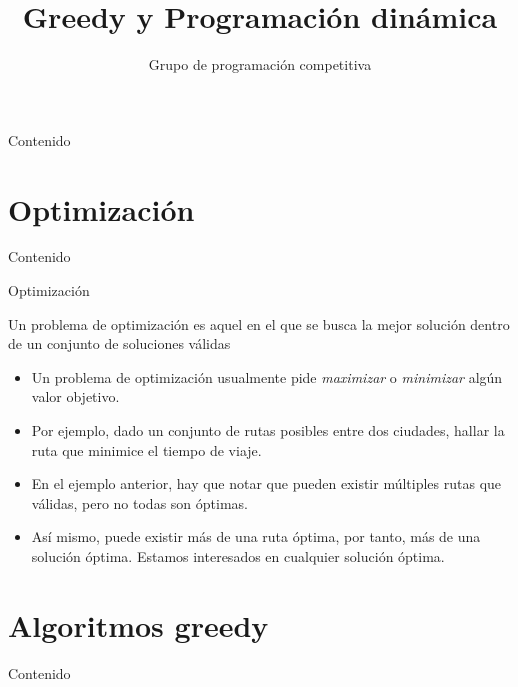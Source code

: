\documentclass[]{beamer}
\title{Greedy y Programaci\'on din\'amica}
\author{Grupo de programaci\'on competitiva}
\institute{Taller de Programaci\'on}
\date{}
\begin{document}
\maketitle

\begin{frame}{Contenido}
\tableofcontents
\end{frame}

\section{Optimizaci\'on}
\begin{frame}{Contenido}
\tableofcontents[currentsection]
\end{frame}

\begin{frame}{Optimizaci\'on}
  \begin{definition}
    Un problema de optimizaci\'on es aquel en el que se busca la mejor soluci\'on dentro de un conjunto de soluciones v\'alidas
  \end{definition}
  \begin{itemize}
    \item Un problema de optimizaci\'on usualmente pide \textit{maximizar} o \textit{minimizar} alg\'un valor objetivo.
    \pause
    \item Por ejemplo, dado un conjunto de rutas posibles entre dos ciudades, hallar la ruta que minimice el tiempo de viaje.
    \pause
    \item En el ejemplo anterior, hay que notar que pueden existir m\'ultiples rutas que v\'alidas, pero no todas son \'optimas.
    \pause
    \item As\'i mismo, puede existir m\'as de una ruta \'optima, por tanto, m\'as de una soluci\'on \'optima. Estamos interesados en cualquier soluci\'on \'optima.
  \end{itemize}
\end{frame}

\section{Algoritmos greedy}
\begin{frame}{Contenido}
\tableofcontents[currentsection]
\end{frame}
\end{document}
